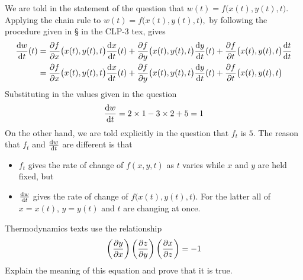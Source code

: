\begin{solution}
We are told in the statement of the question that 
$w(t)= f\big(x(t),y(t),t\big)$.
Applying the chain rule to
$
w(t)= f\big(x(t),y(t),t\big),
$
by following the procedure given in 
\S{} in the CLP-3 tex, gives
\begin{align*}
\diff{w}{t}(t)
    &=\pdiff{f}{x}\big(x(t),y(t),t\big)\diff{x}{t}(t)
    +\pdiff{f}{y}\big(x(t),y(t),t\big)\diff{y}{t}(t)
    +\pdiff{f}{t}\big(x(t),y(t),t\big)\diff{t}{t} \\
   &=\pdiff{f}{x}\big(x(t),y(t),t\big)\diff{x}{t}(t)
    +\pdiff{f}{y}\big(x(t),y(t),t\big)\diff{y}{t}(t)
    +\pdiff{f}{t}\big(x(t),y(t),t\big)
\end{align*}
Substituting in the values given in the question
\begin{equation*}
\diff{w}{t}
    =2\times 1
    -3\times 2
    +5
    =1
\end{equation*}
On the other hand, we are told explicitly in the question that $f_t$ is $5$.
The reason that $f_t$ and $\diff{w}{t}$ are different is that
\begin{itemize}\itemsep1pt \parskip0pt  %
\item
$f_t$ gives the rate of change of $f(x,y,t)$ as $t$ varies 
while $x$ and $y$ are held fixed, but
\item
$\diff{w}{t}$ gives the rate of change of $f\big(x(t),y(t),t\big)$.
For the latter all of $x=x(t)$, $y=y(t)$ and $t$ are 
changing at once.
\end{itemize}
\end{solution}

\begin{question}
Thermodynamics texts
use the relationship 
\begin{equation*}
\left(\pdiff{y}{x}\right)
\left(\pdiff{z}{y}\right)
\left(\pdiff{x}{z}\right)=-1
\end{equation*}
Explain the meaning of this equation and prove that it is true.
\end{question}

